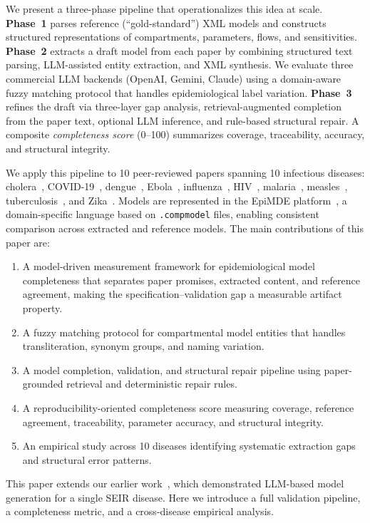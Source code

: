 We present a three-phase pipeline that operationalizes this idea at scale.
\textbf{Phase~1} parses reference (``gold-standard'') XML models and constructs structured
representations of compartments, parameters, flows, and sensitivities.
\textbf{Phase~2} extracts a draft model from each paper by combining structured text
parsing, LLM-assisted entity extraction, and XML synthesis. We evaluate three commercial
LLM backends (OpenAI, Gemini, Claude) using a domain-aware fuzzy matching protocol that
handles epidemiological label variation.
\textbf{Phase~3} refines the draft via three-layer gap analysis, retrieval-augmented
completion from the paper text, optional LLM inference, and rule-based structural repair.
A composite \emph{completeness score} (0--100) summarizes coverage, traceability, accuracy,
and structural integrity.

We apply this pipeline to 10 peer-reviewed papers spanning 10 infectious diseases:
cholera~\cite{Fung2014Cholera}, COVID-19~\cite{TuiteE497}, dengue~\cite{dengue},
Ebola~\cite{Abbas2024Ebola}, influenza~\cite{Corbella2017MonitoringAP},
HIV~\cite{Espitia2022}, malaria~\cite{Akowe2025Malaria}, measles~\cite{Pokharel2024Measles},
tuberculosis~\cite{tuberculosis}, and Zika~\cite{Lee2016Zika}. Models are represented in
the EpiMDE platform~\cite{epimde2024}, a domain-specific language based on
\texttt{.compmodel} files, enabling consistent comparison across extracted and reference
models. The main contributions of this paper are:

\begin{enumerate}[leftmargin=*, label=\arabic*.]
  \item A model-driven measurement framework for epidemiological model completeness that
        separates paper promises, extracted content, and reference agreement, making the
        specification--validation gap a measurable artifact property.
  \item A fuzzy matching protocol for compartmental model entities that handles
        transliteration, synonym groups, and naming variation.
  \item A model completion, validation, and structural repair pipeline using
        paper-grounded retrieval and deterministic repair rules.
  \item A reproducibility-oriented completeness score measuring coverage, reference
        agreement, traceability, parameter accuracy, and structural integrity.
  \item An empirical study across 10 diseases identifying systematic extraction gaps and
        structural error patterns.
\end{enumerate}

This paper extends our earlier work~\cite{11344468}, which demonstrated LLM-based model
generation for a single SEIR disease. Here we introduce a full validation pipeline,
a completeness metric, and a cross-disease empirical analysis.